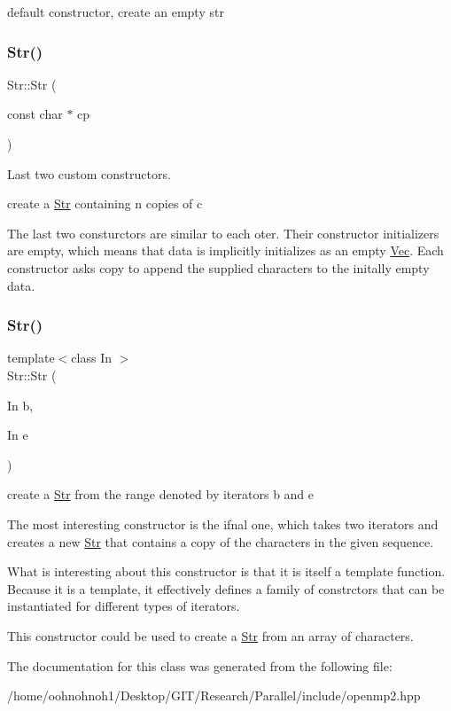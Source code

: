 default constructor, create an empty str \mbox{\label{classStr_a8235816d2687bf223490568a18124cf4}} 
\subsubsection{\texorpdfstring{Str()}{Str()}\hspace{0.1cm}{\footnotesize\ttfamily [2/3]}}
{\footnotesize\ttfamily Str\+::\+Str (\begin{DoxyParamCaption}\item[{const char $\ast$}]{cp }\end{DoxyParamCaption})\hspace{0.3cm}{\ttfamily [inline]}}



Last two custom constructors. 

create a \hyperlink{classStr}{Str} containing n copies of c

The last two consturctors are similar to each oter. Their constructor initializers are empty, which means that data is implicitly initializes as an empty \hyperlink{classVec}{Vec}. Each constructor asks copy to append the supplied characters to the initally empty data. \mbox{\label{classStr_a92caed2384063dca67f93a9788ed1115}} 
\subsubsection{\texorpdfstring{Str()}{Str()}\hspace{0.1cm}{\footnotesize\ttfamily [3/3]}}
{\footnotesize\ttfamily template$<$class In $>$ \\
Str\+::\+Str (\begin{DoxyParamCaption}\item[{In}]{b,  }\item[{In}]{e }\end{DoxyParamCaption})\hspace{0.3cm}{\ttfamily [inline]}}



create a \hyperlink{classStr}{Str} from the range denoted by iterators b and e 

The most interesting constructor is the ifnal one, which takes two iterators and creates a new \hyperlink{classStr}{Str} that contains a copy of the characters in the given sequence.

What is interesting about this constructor is that it is itself a template function. Because it is a template, it effectively defines a family of constrctors that can be instantiated for different types of iterators.

This constructor could be used to create a \hyperlink{classStr}{Str} from an array of characters. 

The documentation for this class was generated from the following file\+:\begin{DoxyCompactItemize}
\item 
/home/oohnohnoh1/\+Desktop/\+G\+I\+T/\+Research/\+Parallel/include/openmp2.\+hpp\end{DoxyCompactItemize}
